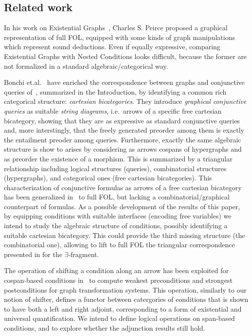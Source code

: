 \subsection{Related work}

In his work on Existential Graphs~\cite{roberts1973-the-existential-graphs-of-charles-s.-peirce}, Charles S. Peirce proposed a graphical representation of full FOL, equipped with some kinds of graph manipulations which represent sound deductions. Even if equally expressive, comparing Existential Graphs with Nested Conditions looks difficult, because the former are not formalized in a standard algebraic/categorical way.

Bonchi et.al.~\cite{DBLP:conf/csl/BonchiSS18} have enriched the correspondence between graphs and conjunctive queries of~\cite{DBLP:conf/stoc/ChandraM77}, summarized in the Introduction,  by identifying a common rich categorical structure: \emph{cartesian bicategories}. They introduce \emph{graphical conjunctive queries} as suitable \emph{string diagrams}, i.e.~arrows of a specific free cartesian bicategory, showing that they are as expressive as standard conjunctive queries and, more interstingly, that the freely generated preorder among them is exactly the entailment preoder among queries. Furthermore, exactly the same algebraic structure is show to arises by considering as arrows cospans of hypergraphs and as preorder the existence of a morphism. This is summarized by a triangular relationship including logical structures (queries), combinatorial structures (hypergraphs), and categorical ones (free cartesian bicategories).  This characterization of conjunctive formulas as arrows of a free cartesian bicategory has been generalized in~\cite{DBLP:journals/corr/abs-2404-18795} to full FOL, but lacking a combinatorial/graphical counterpart of formulas. As a possible development of the results of this paper, by equipping conditions with suitable interfaces (encoding free variables) we intend to study the algebraic structure of conditions, possibly identifying a suitable cartesian bicategory.  This could provide the third missing structure (the combinatorial one), allowing to lift to full FOL the triangular correspondence presented in \cite{DBLP:conf/csl/BonchiSS18} for the $\exists$-fragment.


The operation of shifting a condition along an arrow has been exploited for cospan-based conditions in~\cite{bchk:conditional-reactive-systems} to compute weakest preconditions and strongest postconditions for graph transformation systems. This operation, similarly to our notion of shifter, defines a functor between catergories of conditions that is shown to have both a left and right adjoint, corresponding to a form of existential and universal quantification.  We intend to define logical operations on span-based conditions, and to explore whether the adjunction results still hold.

